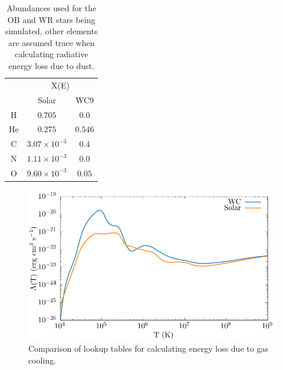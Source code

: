 \begin{table}
  \centering
  \begin{tabular}{@{}ccc@{}}
  \toprule
  \multicolumn{1}{l}{} & \multicolumn{2}{c}{X(E)} \\ \cmidrule(l){2-3} 
   & Solar & WC9 \\ \midrule
  H & $0.705$ & $0.0$ \\
  He & $0.275$ & $0.546$ \\
  C & $3.07 \times 10^{-3}$ & $0.4$ \\
  N & $1.11 \times 10^{-3}$ & $0.0$ \\
  O & $9.60 \times 10^{-3}$ & $0.05$ \\
  \end{tabular}
  \caption[Abundances used for OB and WR stars]{Abundances used for the OB and WR stars being simulated, other elements are assumed trace when calculating radiative energy loss due to dust.}
  \label{tab:abundances}
\end{table}


\begin{figure}[ht]
  \centering
  \includegraphics{assets/cooling-curve/cooling-curve-no-elements.pdf}
  \caption[WR and OB $\Lambda(T)$ cooling curves]{Comparison of lookup tables for calculating energy loss due to gas cooling.}
  \label{fig:cooling-curve}
\end{figure}

